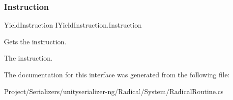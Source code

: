 \subsubsection{\texorpdfstring{Instruction}{Instruction}}
{\footnotesize\ttfamily Yield\+Instruction I\+Yield\+Instruction.\+Instruction\hspace{0.3cm}{\ttfamily [get]}}



Gets the instruction. 

The instruction.

The documentation for this interface was generated from the following file\+:\begin{DoxyCompactItemize}
\item 
Project/\+Serializers/unityserializer-\/ng/\+Radical/\+System/Radical\+Routine.\+cs\end{DoxyCompactItemize}
